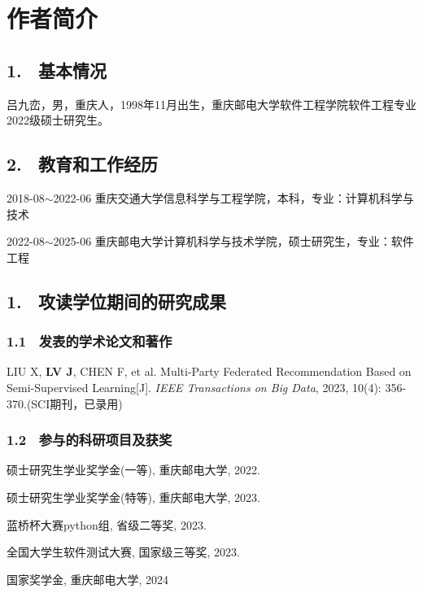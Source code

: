 \specialsectioning


\chapter{作者简介}
\thispagestyle{others}
\pagestyle{others}
\xiaosi

\section{1. \ 基本情况}
吕九峦，男，重庆人，1998年11月出生，重庆邮电大学软件工程学院软件工程专业2022级硕士研究生。

\section{2. \ 教育和工作经历}
2018-08$\sim$2022-06 重庆交通大学信息科学与工程学院，本科，专业：计算机科学与技术

2022-08$\sim$2025-06 重庆邮电大学计算机科学与技术学院，硕士研究生，专业：软件工程
%
\section{1. \ 攻读学位期间的研究成果}

\vspace{0.2cm}


\subsection{1.1 \ 发表的学术论文和著作}
\begin{enumerate}[label={[{\arabic*}]}, leftmargin=2em]
	\item  LIU X, \textbf{LV J}, CHEN F, et al. Multi-Party Federated Recommendation Based on Semi-Supervised Learning[J]. \textit{IEEE Transactions on Big Data}, 2023, 10(4): 356-370.(SCI期刊，已录用)
\end{enumerate}


\subsection{1.2 \ 参与的科研项目及获奖}
\begin{enumerate}[label={[{\arabic*}]}, leftmargin=2em, itemsep=0pt, parsep=0pt, topsep=0pt]
	\item  硕士研究生学业奖学金(一等), 重庆邮电大学, 2022.
	\item  硕士研究生学业奖学金(特等), 重庆邮电大学, 2023.
	\item  蓝桥杯大赛python组, 省级二等奖, 2023.
	\item  全国大学生软件测试大赛, 国家级三等奖, 2023.
	\item  国家奖学金, 重庆邮电大学, 2024
\end{enumerate}







